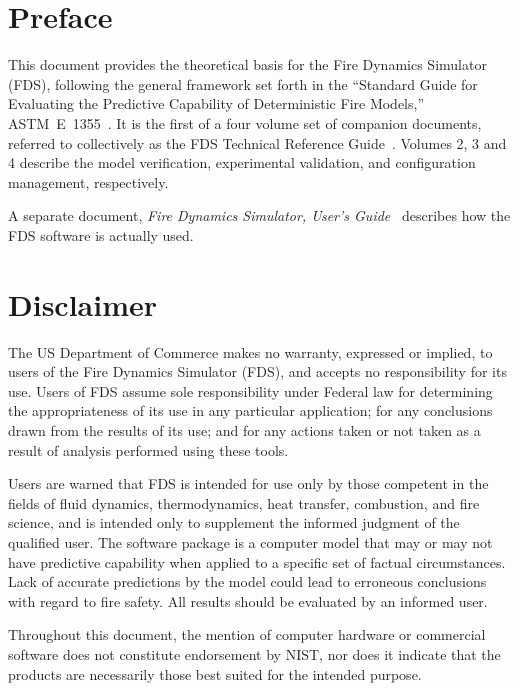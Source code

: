 \documentclass[11pt]{book}
\begin{document}
\newpage

\frontmatter

\pagestyle{plain}



\chapter{Preface}

This document
provides the theoretical basis for the Fire Dynamics Simulator (FDS), following the general framework set forth in
the ``Standard Guide for
Evaluating the Predictive Capability of Deterministic Fire Models,'' ASTM~E~1355~\cite{ASTM:E1355}.
It is the first of a four volume set of companion documents, referred to
collectively as the FDS Technical Reference Guide~\cite{FDS_Tech_Guide}. Volumes 2, 3 and 4 describe the model
verification, experimental validation, and configuration management, respectively.

A separate document, {\em Fire Dynamics Simulator, User's Guide}~\cite{FDS_Users_Guide} describes how the FDS software is
actually used.


\chapter{Disclaimer}

The US Department of Commerce makes no warranty, expressed or implied,
to users of the Fire Dynamics Simulator (FDS), and accepts no responsibility for its use.
Users of FDS assume sole responsibility under Federal law for determining
the appropriateness of its use in any particular application;
for any conclusions drawn from the results of its use; and for any
actions taken or not taken as a result of analysis performed using these tools.

Users are warned that FDS is intended for use only by those competent
in the fields of fluid dynamics, thermodynamics, heat transfer, combustion, and fire science,
and is intended only to supplement the informed judgment of the qualified user.
The software package is a computer model that may or may not have predictive
capability when applied to a specific set of factual circumstances.
Lack of accurate predictions by the model could lead to erroneous
conclusions with regard to fire safety. All results should be evaluated by an informed user.

Throughout this document, the mention of computer hardware or commercial
software does not constitute endorsement by NIST, nor does it indicate that
the products are necessarily those best suited for the intended purpose.
\end{document}

